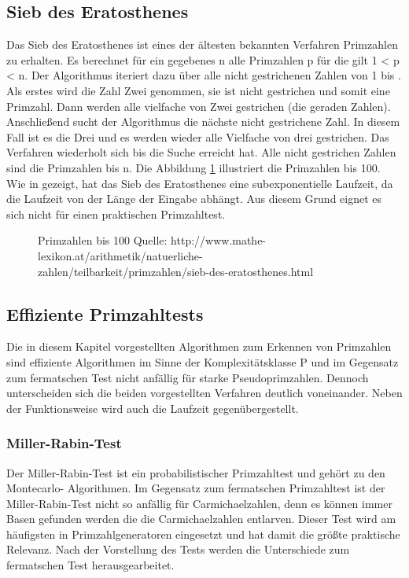 	\subsection{Sieb des Eratosthenes}
	Das Sieb des Eratosthenes ist eines der ältesten bekannten Verfahren Primzahlen zu erhalten. Es berechnet für ein gegebenes n \myin {} alle Primzahlen p \myin {} für die gilt 1 < p < n. Der Algorithmus iteriert dazu über alle nicht gestrichenen Zahlen von 1 bis . Als erstes wird die Zahl Zwei genommen, sie ist nicht gestrichen und somit eine Primzahl. Dann werden alle vielfache von Zwei gestrichen (die geraden Zahlen). Anschließend sucht der Algorithmus die nächste nicht gestrichene Zahl. In diesem Fall ist es die Drei und es werden wieder alle Vielfache von drei gestrichen. Das Verfahren wiederholt sich bis die Suche  erreicht hat. Alle nicht gestrichen Zahlen sind die Primzahlen bis n. Die Abbildung \ref{ABBILDUNG_Primzahlen_100} illustriert die Primzahlen bis 100.
	Wie in \cite{Algebraische:und:zahlentheoretische:Grundlagen:fuer:die:Informatik} gezeigt, hat das Sieb des Eratosthenes eine subexponentielle Laufzeit, da die Laufzeit von der Länge der Eingabe abhängt. Aus diesem Grund eignet es sich nicht für einen praktischen Primzahltest.
	\begin{figure}
		\centering
		\caption{Primzahlen bis 100 Quelle: http://www.mathe-lexikon.at/arithmetik/natuerliche-zahlen/teilbarkeit/primzahlen/sieb-des-eratosthenes.html}
		\label{ABBILDUNG_Primzahlen_100}
	\end{figure}
	
	\subsection{Effiziente Primzahltests} \label{Effiziente Primzahltests}
		Die in diesem Kapitel vorgestellten Algorithmen zum Erkennen von Primzahlen sind effiziente Algorithmen im Sinne der Komplexitätsklasse P und im Gegensatz zum fermatschen Test nicht anfällig für starke Pseudoprimzahlen. Dennoch unterscheiden sich die beiden vorgestellten Verfahren deutlich voneinander. Neben der Funktionsweise wird auch die Laufzeit gegenübergestellt.
		
		\subsubsection{Miller-Rabin-Test}
		 Der Miller-Rabin-Test ist ein probabilistischer Primzahltest und gehört zu den Montecarlo- Algorithmen. Im Gegensatz zum fermatschen Primzahltest ist der Miller-Rabin-Test nicht so anfällig für Carmichaelzahlen, denn es können immer Basen gefunden werden die die Carmichaelzahlen entlarven. Dieser Test wird am häufigsten in Primzahlgeneratoren eingesetzt und hat damit die größte praktische Relevanz. Nach der Vorstellung des Tests werden die Unterschiede zum fermatschen Test herausgearbeitet.
		 

